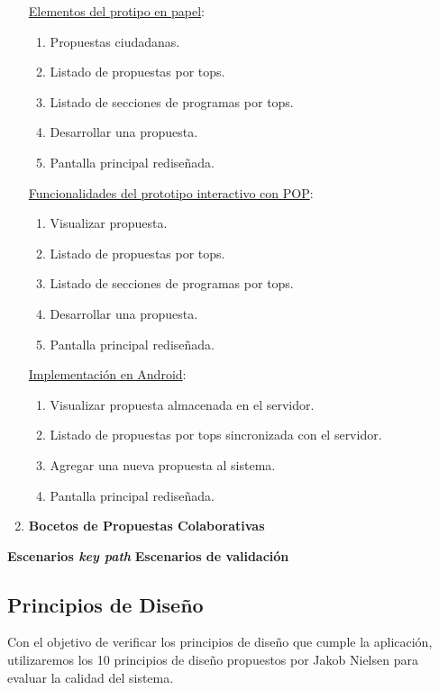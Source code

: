 \begin{enumerate}
\underline{Elementos del protipo en papel}:

\begin{enumerate}
 \item Propuestas ciudadanas.
 \item Listado de propuestas por tops.
 \item Listado de secciones de programas por tops.
 \item Desarrollar una propuesta.
 \item Pantalla principal rediseñada.
\end{enumerate}

\underline{Funcionalidades del prototipo interactivo con POP}:

\begin{enumerate}
 \item Visualizar propuesta.
 \item Listado de propuestas por tops.
 \item Listado de secciones de programas por tops.
 \item Desarrollar una propuesta.
 \item Pantalla principal rediseñada.
\end{enumerate}

\underline{Implementación en Android}:

\begin{enumerate}
 \item Visualizar propuesta almacenada en el servidor.
 \item Listado de propuestas por tops sincronizada con el servidor.
 \item Agregar una nueva propuesta al sistema.
 \item Pantalla principal rediseñada.
\end{enumerate}

\item \textbf{Bocetos de Propuestas Colaborativas}

\end{enumerate}

\textbf{Escenarios \textit{key path}}
\textbf{Escenarios de validación}

\subsection{Principios de Diseño}

Con el objetivo de verificar los principios de diseño que cumple la aplicación, utilizaremos los 10 principios de diseño propuestos por Jakob Nielsen \cite{ref:nielsen} para evaluar la calidad del sistema.

